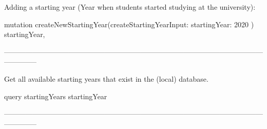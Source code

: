 Adding a starting year (Year when students started studying at the university):

mutation {
  createNewStartingYear(createStartingYearInput: {
    startingYear: 2020
  }) {
    startingYear,
  }
}

--------------------------------------------------------------------------------------------------------------------------

Get all available starting years that exist in the (local) database.

query {
  startingYears {
    startingYear
  }
}

--------------------------------------------------------------------------------------------------------------------------